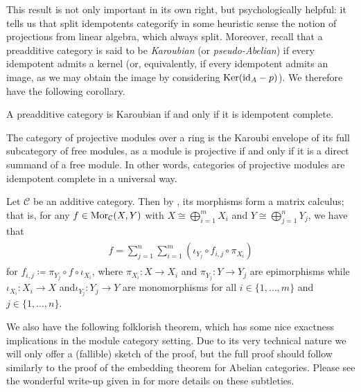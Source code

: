 \noindent This result is not only important in its own right, but psychologically helpful: it tells us that split idempotents categorify in some heuristic sense the notion of projections from linear algebra, which always split. Moreover, recall that a preadditive category is said to be {\em Karoubian} (or {\em pseudo-Abelian}) if every idempotent admits a kernel (or, equivalently, if every idempotent admits an image, as we may obtain the image by considering $\textup{Ker}(\textup{id}_A - p)$). We therefore have the following corollary.\\

\noindent\begin{corollary} A preadditive category is Karoubian if and only if it is idempotent complete.\\
\end{corollary}

\noindent\begin{example} The category of projective modules over a ring is the Karoubi envelope of its full subcategory of free modules, as a module is projective if and only if it is a direct summand of a free module. In other words, categories of projective modules are idempotent complete in a universal way.\\
\end{example}

\noindent\begin{remark}\label{MatrixCalculus} Let $\mathcal{C}$ be an additive category. Then by \cite[\S VIII.2]{Mac13}, its morphisms form a matrix calculus; that is, for any $f \in \textnormal{Mor}_\mathcal{C}(X, Y)$ with $X \cong \bigoplus_{i=1}^m{X_i}$ and $Y \cong \bigoplus_{j=1}^n{Y_j}$, we have that\\[-\linespacing]
\begin{align*}
\begin{split}
f = \sum_{j=1}^n{\sum_{i=1}^m{(\iota_{Y_j} \circ f_{i,j} \circ \pi_{X_i})}}
\end{split}
\end{align*}
\noindent for $f_{i,j} \coloneqq \pi_{Y_j} \circ f \circ \iota_{X_i}$, where $\pi_{X_i} : X \to X_i$ and $\pi_{Y_j} : Y \to Y_j$ are epimorphisms while $\iota_{X_i} : X_i \to X$ and\linebreak $\iota_{Y_j} : Y_j \to Y$ are monomorphisms for all $i \in \{1, \dots, m\}$ and $j \in \{1, \dots, n\}$.\\
\end{remark}

\noindent We also have the following folklorish theorem, which has some nice exactness implications in the module category setting. Due to its very technical nature we will only offer a (fallible) sketch of the proof, but the full proof should follow similarly to the proof of the embedding theorem for Abelian categories. Please see the wonderful write-up given in \cite{Jun19} for more details on these subtleties.\\

